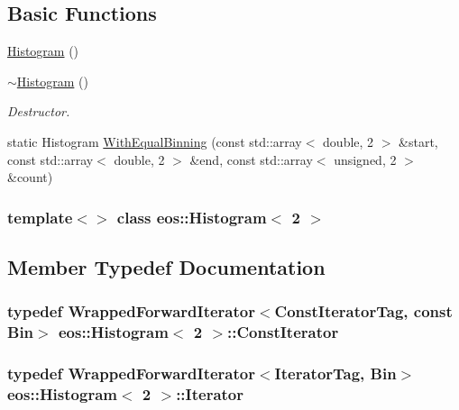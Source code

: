 \subsection*{Basic Functions}
\label{_amgrp2386c9a1f1785edee33f374dd2db9b3d}
 \begin{DoxyCompactItemize}
\item 
\hyperlink{classeos_1_1Histogram_3_012_01_4_a3d387d2bf355745d10ddc148737f63e3}{Histogram} ()
\item 
\hyperlink{classeos_1_1Histogram_3_012_01_4_a0c3188267bcbf7b492c6d3deb926b277}{$\sim$Histogram} ()
\begin{DoxyCompactList}\small\item\em Destructor. \item\end{DoxyCompactList}\item 
static Histogram \hyperlink{classeos_1_1Histogram_3_012_01_4_ac029776d8b8b56356e073928be272d02}{WithEqualBinning} (const std::array$<$ double, 2 $>$ \&start, const std::array$<$ double, 2 $>$ \&end, const std::array$<$ unsigned, 2 $>$ \&count)
\end{DoxyCompactItemize}
\subsubsection*{template$<$$>$ class eos::Histogram$<$ 2 $>$}



\subsection{Member Typedef Documentation}
\hypertarget{classeos_1_1Histogram_3_012_01_4_ad4594c8c5127b71c535b1389bcc2fdca}{
\subsubsection[{ConstIterator}]{\setlength{\rightskip}{0pt plus 5cm}typedef {\bf WrappedForwardIterator}$<$ConstIteratorTag, const Bin$>$ eos::Histogram$<$ 2 $>$::{\bf ConstIterator}}}
\label{classeos_1_1Histogram_3_012_01_4_ad4594c8c5127b71c535b1389bcc2fdca}
\hypertarget{classeos_1_1Histogram_3_012_01_4_a9ed06cf8cfcef9f4ed3b9786d48f76e4}{
\subsubsection[{Iterator}]{\setlength{\rightskip}{0pt plus 5cm}typedef {\bf WrappedForwardIterator}$<$IteratorTag, Bin$>$ eos::Histogram$<$ 2 $>$::{\bf Iterator}}}
\label{classeos_1_1Histogram_3_012_01_4_a9ed06cf8cfcef9f4ed3b9786d48f76e4}



